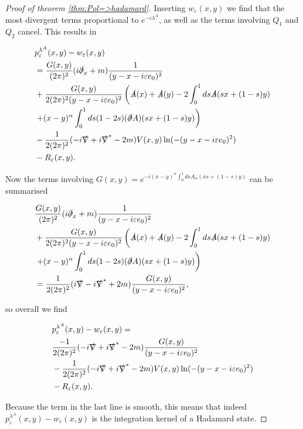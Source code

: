 \documentclass[b5paper,draft,openbib,12pt]{memoir}
\begin{document}
\begin{proof}[Proof of theorem \ref{thm:Pol=>hadamard}]
Inserting \(w_\varepsilon(x,y)\) we find that the most divergent 
terms proportional to \(e^{-i\lambda^A}\), as well as the terms involving \(Q_1\) and \(Q_2\) cancel.
This results in 

\begin{align*}
&p_\varepsilon^{\lambda^A}(x,y)-w_\varepsilon(x,y)\\
&=\frac{G(x,y)}{(2\pi)^2}(i\slashed{\partial}_x+m)\frac{1}{(y-x-i\varepsilon e_0)^2}\\
&+\frac{G(x,y)}{2(2\pi)^2 (y-x-i\varepsilon e_0)^2}\left( \slashed{A}(x)+\slashed{A}(y) -2 \int_0^1 ds \slashed{A}(sx +(1-s)y) \right.\\
&\left.+ (x-y)^\alpha \int_0^1 ds (1-2s)(\slashed{\partial}A)(sx + (1-s)y) \right)\\
&- \frac{1}{2(2\pi)^2} (-i\slashed{\nabla}+i\slashed{\nabla}^* -2m) V(x,y)\ln (-(y-x-i\varepsilon e_0)^2)\\
&-R_\varepsilon(x,y).
\end{align*}

Now the terms involving 
\(G(x,y)=e^{-i (x-y)^\alpha\int_0^1 ds A_\alpha (x s + (1-s)y)}\) 
can be summarised

\begin{align*}
&\frac{G(x,y)}{(2\pi)^2}(i\slashed{\partial}_x+m)\frac{1}{(y-x-i\varepsilon e_0)^2}\\
&+\frac{G(x,y)}{2(2\pi)^2 (y-x-i\varepsilon e_0)^2}\left( \slashed{A}(x)+\slashed{A}(y) -2 \int_0^1 ds \slashed{A}(sx +(1-s)y) \right.\\
&\left.+ (x-y)^\alpha \int_0^1 ds (1-2s)(\slashed{\partial}A)(sx + (1-s)y) \right)\\
&=\frac{1}{2(2\pi)^2 }(i\slashed{\nabla}-i\slashed{\nabla}^*+2m) \frac{G(x,y)}{(y-x-i\varepsilon e_0)^2},
\end{align*}

so overall we find

\begin{align*}
&p_\varepsilon^{\lambda^A}(x,y)-w_\varepsilon(x,y)=\\
&\frac{-1}{2(2\pi)^2 }(-i\slashed{\nabla}+i\slashed{\nabla}^*-2m) \frac{G(x,y)}{(y-x-i\varepsilon e_0)^2}\\
&- \frac{1}{2(2\pi)^2} (-i\slashed{\nabla}+i\slashed{\nabla}^* -2m) V(x,y)\ln (-(y-x-i\varepsilon e_0)^2)\\
&-R_\varepsilon(x,y).
\end{align*}

Because the term in the last line is smooth, this means that indeed \(p_\varepsilon^{\lambda^A}(x,y)-w_\varepsilon(x,y)\) is the integration kernel of a Hadamard state.


\end{proof}
\end{document}

